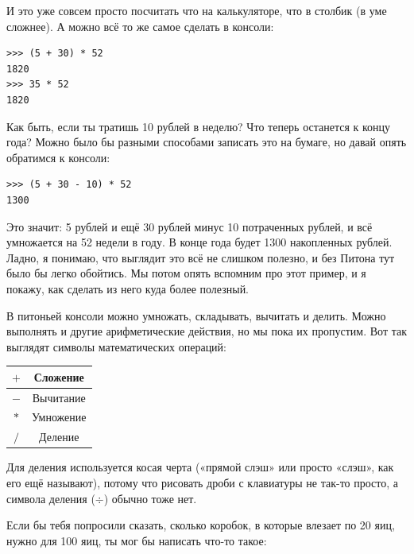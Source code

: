 И это уже совсем просто посчитать что на калькуляторе, что в столбик (в уме сложнее). А можно всё то же самое сделать в консоли:

\begin{listing}
\begin{verbatim}
>>> (5 + 30) * 52
1820
>>> 35 * 52
1820
\end{verbatim}
\end{listing}

Как быть, если ты тратишь 10 рублей в неделю? Что теперь останется к концу года? Можно было бы разными способами записать это на бумаге, но давай опять обратимся к консоли:

\begin{listing}
\begin{verbatim}
>>> (5 + 30 - 10) * 52
1300
\end{verbatim}
\end{listing}

Это значит: 5 рублей и ещё 30 рублей минус 10 потраченных рублей, и всё умножается на 52 недели в году. В конце года будет 1300 накопленных рублей. Ладно, я понимаю, что выглядит это всё не слишком полезно, и без Питона тут было бы легко обойтись. Мы потом опять вспомним про этот пример, и я покажу, как сделать из него куда более полезный.

В питоньей консоли можно умножать, складывать, вычитать и делить. Можно выполнять и другие арифметические действия, но мы пока их пропустим. Вот так выглядят символы математических операций:

\begin{center}
\begin{tabular}{|c|c|}
\hline
$+$ & Сложение \\
\hline
$-$ & Вычитание \\
\hline
$*$ & Умножение \\
\hline
$/$ & Деление \\
\hline
\end{tabular}
\end{center}

Для деления используется косая черта («прямой слэш» или просто «слэш», как его ещё называют), потому что рисовать дроби с клавиатуры не так-то просто, а символа деления ($\div$) обычно тоже нет.

Если бы тебя попросили сказать, сколько коробок, в которые влезает по 20 яиц, нужно для 100 яиц, ты мог бы написать что-то такое:

